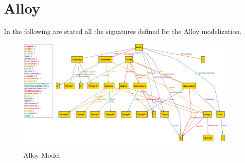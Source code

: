\section{Alloy}

In the following are stated all the signatures defined for the Alloy modelization.
\vspace{0.5 cm}


\vspace{2cm}

\begin{figure}[h]
    \centering
    \includegraphics[width=\textwidth]{src/Alloy-model.png}
    \caption*{Alloy Model}
\end{figure} \vspace{0.5cm}
